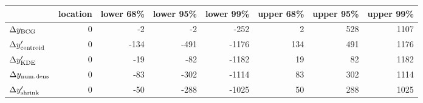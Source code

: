 \begin{tabular}{lrrrrrrr}
\toprule
{} &  location &  lower 68\% &  lower 95\% &  lower 99\% &  upper 68\% &  upper 95\% &  upper 99\% \\
\midrule
$\Delta y_{\rm BCG}$       &         0 &           -2 &          -2 &        -252
&          2 &         528 &        1107 \\
$\Delta y_{\rm centroid}'$ &         0 &        -134 &        -491 &       -1176 &         134 &         491 &        1176 \\
$\Delta y_{\rm KDE}'$      &         0 &         -19 &         -82 &       -1182 &          19 &          82 &        1182 \\
$\Delta y_{\rm num.dens}$  &         0 &         -83 &        -302 &       -1114 &          83 &         302 &        1114 \\
$\Delta y_{\rm shrink}'$   &         0 &         -50 &        -288 &       -1025 &          50 &         288 &        1025 \\
\bottomrule
\end{tabular}
